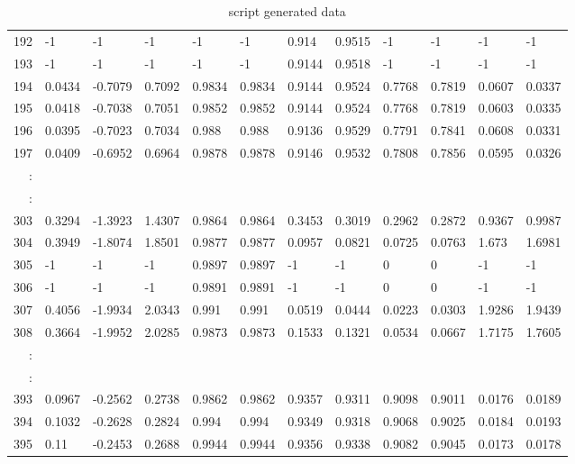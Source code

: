 \begin{table}[p]
{\begin{minipage}{\textheight}
\begin{tabular}{r|lll|ll|llll|ll}
192    & -1      & -1      & -1     & -1     & -1     & 0.914  & 0.9515 & -1     & -1     & -1     & -1     \\
193    & -1      & -1      & -1     & -1     & -1     & 0.9144 & 0.9518 & -1     & -1     & -1     & -1     \\
194    & 0.0434  & -0.7079 & 0.7092 & 0.9834 & 0.9834 & 0.9144 & 0.9524 & 0.7768 & 0.7819 & 0.0607 & 0.0337 \\
195    & 0.0418  & -0.7038 & 0.7051 & 0.9852 & 0.9852 & 0.9144 & 0.9524 & 0.7768 & 0.7819 & 0.0603 & 0.0335 \\
196    & 0.0395  & -0.7023 & 0.7034 & 0.988  & 0.988  & 0.9136 & 0.9529 & 0.7791 & 0.7841 & 0.0608 & 0.0331 \\
197    & 0.0409  & -0.6952 & 0.6964 & 0.9878 & 0.9878 & 0.9146 & 0.9532 & 0.7808 & 0.7856 & 0.0595 & 0.0326 \\
: &         &         &        &        &        &        &        &        &        &        &        \\
\hline
: &         &         &        &        &        &        &        &        &        &        &        \\
303    & 0.3294  & -1.3923 & 1.4307 & 0.9864 & 0.9864 & 0.3453 & 0.3019 & 0.2962 & 0.2872 & 0.9367 & 0.9987 \\
304    & 0.3949  & -1.8074 & 1.8501 & 0.9877 & 0.9877 & 0.0957 & 0.0821 & 0.0725 & 0.0763 & 1.673  & 1.6981 \\
305    & -1      & -1      & -1     & 0.9897 & 0.9897 & -1     & -1     & 0      & 0      & -1     & -1     \\
306    & -1      & -1      & -1     & 0.9891 & 0.9891 & -1     & -1     & 0      & 0      & -1     & -1     \\
307    & 0.4056  & -1.9934 & 2.0343 & 0.991  & 0.991  & 0.0519 & 0.0444 & 0.0223 & 0.0303 & 1.9286 & 1.9439 \\
308    & 0.3664  & -1.9952 & 2.0285 & 0.9873 & 0.9873 & 0.1533 & 0.1321 & 0.0534 & 0.0667 & 1.7175 & 1.7605 \\
: &         &         &        &        &        &        &        &        &        &        &        \\
\hline
: &         &         &        &        &        &        &        &        &        &        &        \\
393    & 0.0967  & -0.2562 & 0.2738 & 0.9862 & 0.9862 & 0.9357 & 0.9311 & 0.9098 & 0.9011 & 0.0176 & 0.0189 \\
394    & 0.1032  & -0.2628 & 0.2824 & 0.994  & 0.994  & 0.9349 & 0.9318 & 0.9068 & 0.9025 & 0.0184 & 0.0193 \\
395    & 0.11    & -0.2453 & 0.2688 & 0.9944 & 0.9944 & 0.9356 & 0.9338 & 0.9082 & 0.9045 & 0.0173 & 0.0178
\end{tabular}
       \caption{script generated data}
       \label{tab:spit-out}
     \end{minipage}
   }
 \end{table}
 
